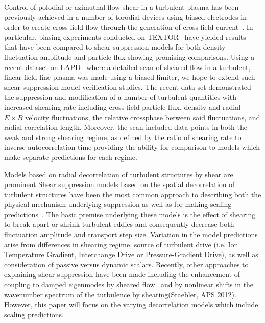 \documentclass[aip,pop,amsmath,amssymb,preprint,superscriptaddress]{revtex4-1} %
\begin{document}
Control of polodial or azimuthal flow shear in a turbulent plasma has been previously achieved in a number of torodial devices using biased electrodes in order to create cross-field flow through the generation of cross-field current~\cite{taylor89,weynants92}. In particular, biasing experiments conducted on TEXTOR~\cite{weynants98,boedo00,boedo02} have yielded results that have been compared to shear suppression models for both density fluctuation amplitude and particle flux showing promising comparisons. Using a recent dataset on LAPD~\cite{schaffner12} where a detailed scan of sheared flow in a turbulent, linear field line plasma was made using a biased limiter, we hope to extend such shear suppression model verification studies. The recent data set demonstrated the suppression and modification of a number of turbulent quantities with increased shearing rate including cross-field particle flux, density and radial $E\times B$ velocity fluctuations, the relative crossphase between said fluctuations, and radial correlation length. Moreover, the scan included data points in both the weak and strong shearing regime, as defined by the ratio of shearing rate to inverse autocorrelation time providing the ability for comparison to models which make separate predictions for each regime.

Models based on radial decorrelation of turbulent structures by shear are prominent Shear suppression models based on the spatial decorrelation of turbulent structures have been the most common approach to describing both the physical mechanism underlying suppression as well as for making scaling predictions~\cite{terry00}. The basic premise underlying these models is the effect of shearing to break apart or shrink turbulent eddies and consequently decrease both fluctuation amplitude and transport step size. Variation in the model predictions arise from differences in shearing regime, source of turbulent drive (i.e. Ion Temperature Gradient, Interchange Drive or Pressure-Gradient Drive), as well as consideration of passive versus dynamic scalars. Recently, other approaches to explaining shear suppression have been made including the enhancement of coupling to damped eigenmodes by sheared flow~\cite{terry06} and by nonlinear shifts in the wavenumber spectrum of the turbulence by shearing(Staebler, APS 2012). However, this paper will focus on the varying decorrelation models which include scaling predictions. 
\end{document}
